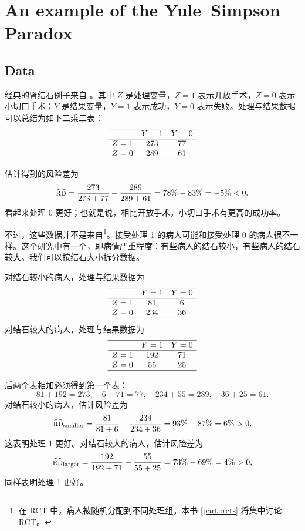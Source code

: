 \section{An example of the Yule--Simpson Paradox}

\subsection{Data}

经典的肾结石例子来自 \citet{charig1986comparison}。其中 $Z$ 是处理变量，$Z=1$ 表示开放手术，$Z=0$ 表示小切口手术；$Y$ 是结果变量，$Y=1$ 表示成功，$Y=0$ 表示失败。处理与结果数据可以总结为如下二乘二表：
\[
\begin{array}{lcc}
\hline
        & Y=1 & Y=0 \\\hline
Z=1 & 273 & 77\\
Z=0 & 289 & 61\\
\hline
\end{array}
\]

估计得到的风险差为
\[
\widehat{\textsc{rd}}
= \frac{273}{273+77}-\frac{289}{289+61}
=78\%-83\%=-5\%<0 .
\]
看起来处理 0 更好；也就是说，相比开放手术，小切口手术有更高的成功率。

不过，这些数据并不是来自\footnote{在 RCT 中，病人被随机分配到不同处理组。本书 \cref{part::rcts} 将集中讨论 RCT。}。接受处理 1 的病人可能和接受处理 0 的病人很不一样。这个研究中有一个，即病情严重程度：有些病人的结石较小，有些病人的结石较大。我们可以按结石大小拆分数据。

对结石较小的病人，处理与结果数据为
\[
\begin{array}{lcc}
\hline
        & Y=1 & Y=0 \\\hline
Z=1 & 81 & 6\\
Z=0 & 234 & 36\\
\hline
\end{array}
\]
对结石较大的病人，处理与结果数据为
\[
\begin{array}{lcc}
\hline
        & Y=1 & Y=0 \\\hline
Z=1 & 192 & 71\\
Z=0 & 55 & 25\\
\hline
\end{array}
\]

后两个表相加必须得到第一个表：
\[
81+192=273,\quad
6+71=77,\quad
234+55=289,\quad
36+25=61 .
\]
对结石较小的病人，估计风险差为
\[
\widehat{\textsc{rd}}_{\text{smaller}}
= \frac{81}{81+6}-\frac{234}{234+36}
=93\%-87\%=6\%>0,
\]
这表明处理 1 更好。对结石较大的病人，估计风险差为
\[
\widehat{\textsc{rd}}_{\text{larger}}
= \frac{192}{192+71}-\frac{55}{55+25}
=73\%-69\%=4\%>0,
\]
同样表明处理 1 更好。

